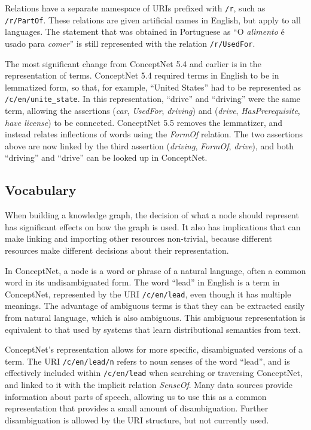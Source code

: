 \documentclass[letterpaper]{article}
\begin{document}
Relations have a separate namespace of URIs prefixed with \texttt{/r}, such as
\texttt{/r/PartOf}. These relations are given artificial names in English, but
apply to all languages. The statement that was obtained in Portuguese as ``O
\emph{alimento} é usado para \emph{comer}'' is still represented with the
relation \texttt{/r/UsedFor}.

The most significant change from ConceptNet 5.4 and earlier is in the
representation of terms. ConceptNet 5.4 required terms in English to be in
lemmatized form, so that, for example, ``United States'' had to be represented
as \texttt{/c/en/unite\_state}. In this representation, ``drive'' and
``driving'' were the same term, allowing the assertions (\emph{car},
\emph{UsedFor}, \emph{driving}) and (\emph{drive}, \emph{HasPrerequisite},
\emph{have license}) to be connected. ConceptNet 5.5 removes the lemmatizer,
and instead relates inflections of words using the \emph{FormOf} relation. The
two assertions above are now linked by the third assertion (\emph{driving},
\emph{FormOf}, \emph{drive}), and both ``driving'' and ``drive'' can be looked
up in ConceptNet.

\subsection{Vocabulary}\label{vocabulary}

When building a knowledge graph, the decision of what a node should
represent has significant effects on how the graph is used. It also has
implications that can make linking and importing other resources
non-trivial, because different resources make different decisions about
their representation.

In ConceptNet, a node is a word or phrase of a natural language, often a common
word in its undisambiguated form. The word ``lead'' in English is a term in
ConceptNet, represented by the URI \texttt{/c/en/lead}, even though it has
multiple meanings. The advantage of ambiguous terms is that they can be
extracted easily from natural language, which is also ambiguous. This ambiguous
representation is equivalent to that used by systems that learn distributional
semantics from text.

ConceptNet's representation allows for more specific, disambiguated
versions of a term. The URI \texttt{/c/en/lead/n} refers to noun senses
of the word ``lead'', and is effectively included within
\texttt{/c/en/lead} when searching or traversing ConceptNet, and
linked to it with the implicit relation \emph{SenseOf}. Many data
sources provide information about parts of speech, allowing us to use
this as a common representation that provides a small amount of
disambiguation. Further disambiguation is allowed by the URI structure,
but not currently used.
\end{document}
